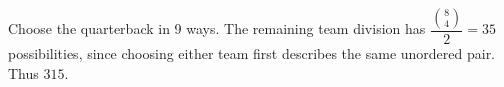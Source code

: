Choose the quarterback in 9 ways. The remaining team division has $\dfrac{\binom84}{2}=35 $ possibilities, since choosing either team first describes the same unordered pair. Thus $\boxed{315}$.
